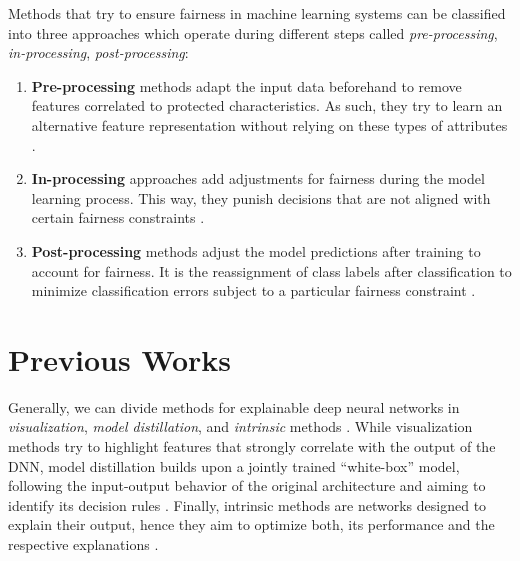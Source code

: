 Methods that try to ensure fairness in machine learning systems can be classified into three approaches which operate during different steps called \emph{pre-processing}, \emph{in-processing}, \emph{post-processing}:
\begin{enumerate}
    \item \textbf{Pre-processing} methods adapt the input data beforehand to remove features correlated to protected characteristics. As such, they try to learn an alternative feature representation without relying on these types of attributes \citep{GordalizaBGL19, CalmonWVRV17, LouizosSLWZ15, ZemelWSPD13}. 
    \item \textbf{In-processing} approaches add adjustments for fairness during the model learning process. This way, they punish decisions that are not aligned with certain fairness constraints \citep{DworkIKL18, DoniniOBSP18, AgarwalBD0W18}.
    \item \textbf{Post-processing} methods adjust the model predictions after training to account for fairness. It is the reassignment of class labels after classification to minimize classification errors subject to a particular fairness constraint \citep{HardtPNS16,PleissRWKW17, FeldmanFMSV15}.
\end{enumerate}


\section{Previous Works}



 
 Generally, we can divide methods for explainable deep neural networks in \emph{visualization}, \emph{model distillation}, and \emph{intrinsic} methods \citep{xie2020explainable}. While visualization methods try to highlight features that strongly correlate with the output of the DNN, model distillation builds upon a jointly trained ``white-box'' model, following the input-output behavior of the original architecture and aiming to identify its decision rules \citep{xie2020explainable}. Finally, intrinsic methods are networks designed to explain their output, hence they aim to optimize both, its performance and the respective explanations \citep{xie2020explainable}.

